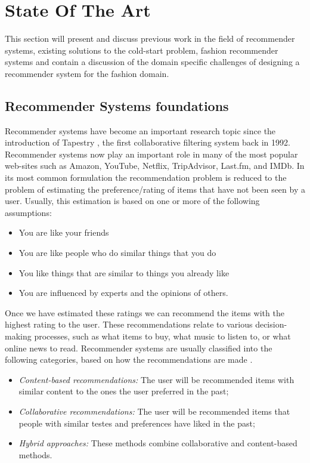
\section{State Of The Art}
\label{sec:SotA}

This section will present and discuss previous work in the field of recommender
systems, existing solutions to the cold-start problem, fashion recommender
systems and contain a discussion of the domain specific challenges of designing
a recommender system for the fashion domain.

\subsection{Recommender Systems foundations}

Recommender systems have become an important research topic since the
introduction of Tapestry \cite{Goldberg1992}, the first collaborative filtering
system back in 1992. Recommender systems now play an important role in many of
the most popular web-sites such as Amazon, YouTube, Netflix, TripAdvisor,
Last.fm, and IMDb. In its most common formulation the recommendation problem is
reduced to the problem of estimating the preference/rating of items that have
not been seen by a user. Usually, this estimation is based on one or more of
the following assumptions:

\begin{itemize}
\item You are like your friends
\item You are like people who do similar things that you do
\item You like things that are similar to things you already like
\item You are influenced by experts and the opinions of others.
\end{itemize}

Once we have estimated these ratings we can recommend the items with the
highest rating to the user. These recommendations relate to various
decision-making processes, such as what items to buy, what music to listen to,
or what online news to read. Recommender systems are usually classified into
the following categories, based on how the recommendations are made
\cite{Adomavicius2005}.

\begin{itemize}
\item \emph{Content-based recommendations:} The user will be recommended items with similar content to the ones the user preferred in the past;
\item \emph{Collaborative recommendations:} The user will be recommended items that people with similar testes and preferences have liked in the past;
\item \emph{Hybrid approaches:} These methods combine collaborative and content-based methods.
\end{itemize}

